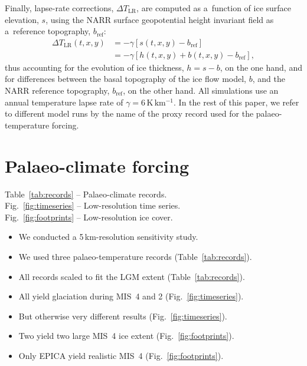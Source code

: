 \documentclass{article}
\newcommand{\unit}[1]{\ensuremath{\mathrm{#1}}}
\begin{document}
      Finally, lapse-rate corrections, ${\Delta}T_{\text{LR}}$, are computed
      as a~function of ice surface elevation, $s$, using the NARR surface
      geopotential height invariant field as a~reference topography,
      $b_{\text{ref}}$:
\begin{align}
{\Delta}T_{\text{LR}}(t, x, y) &= -\gamma [s(t, x, y)-b_{\text{ref}}] \\
                            &= -\gamma [h(t, x, y)+b(t, x, y)-b_{\text{ref}}],
\end{align}
      thus accounting for the evolution of ice thickness, ${h=s-b}$, on the
      one hand, and for differences between the basal topography of the ice
      flow model, $b$, and the NARR reference topography, $b_{\text{ref}}$,
      on the other hand. All simulations use an annual temperature lapse
      rate of $\gamma = 6\,\unit{K\,km^{-1}}$. In the rest of this paper, we
      refer to different model runs by the name of the proxy record used for
      the palaeo-temperature forcing.


\section{Palaeo-climate forcing}

    Table~\ref{tab:records} -- Palaeo-climate records.\\
    Fig.~\ref{fig:timeseries} -- Low-resolution time series.\\
    Fig.~\ref{fig:footprints} -- Low-resolution ice cover.

    \begin{itemize}
    \item We conducted a 5\,km-resolution sensitivity study.
    \item We used three palaeo-temperature records (Table~\ref{tab:records}).
    \item All records scaled to fit the LGM extent (Table~\ref{tab:records}).
    \item All yield glaciation during MIS~4 and 2 (Fig.~\ref{fig:timeseries}).
    \item But otherwise very different results (Fig.~\ref{fig:timeseries}).
    \item Two yield two large MIS~4 ice extent (Fig.~\ref{fig:footprints}).
    \item Only EPICA yield realistic MIS~4 (Fig.~\ref{fig:footprints}).
    \end{itemize}
\end{document}
